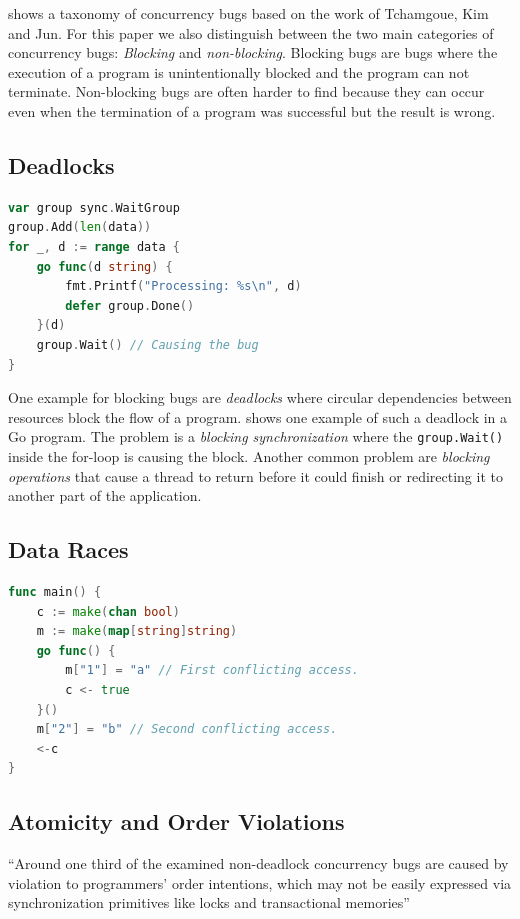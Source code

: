\documentclass[conference]{IEEEtran}
\begin{document}
 shows a taxonomy of concurrency bugs based on the work of Tchamgoue, Kim and Jun. \cite{tchamgoue2012testing}
For this paper we also distinguish between the two main categories of concurrency bugs: \emph{Blocking} and \emph{non-blocking}.
Blocking bugs are bugs where the execution of a program is unintentionally blocked and the program can not terminate.
Non-blocking bugs are often harder to find because they can occur even when the termination of a program was successful but the result is wrong.


\subsection{Deadlocks}
\begin{lstlisting}[language=Go, label=lst:deadlock, caption=Deadlock example -- based on \cite{tu2019go}]
var group sync.WaitGroup
group.Add(len(data))
for _, d := range data {
    go func(d string) {
        fmt.Printf("Processing: %s\n", d)
        defer group.Done()
    }(d)
    group.Wait() // Causing the bug
}
\end{lstlisting}

One example for blocking bugs are \emph{deadlocks} where circular dependencies between resources block the flow of a program.
 shows one example of such a deadlock in a Go program.
The problem is a \emph{blocking synchronization} where the \lstinline{group.Wait()} inside the for-loop is causing the block.
Another common problem are \emph{blocking operations} that cause a thread to return before it could finish or redirecting it to another part of the application.


\subsection{Data Races}
\begin{lstlisting}[language=Go, caption=Data race example -- based on \cite{goRaceDetector}]
func main() {
	c := make(chan bool)
	m := make(map[string]string)
	go func() {
		m["1"] = "a" // First conflicting access.
		c <- true
	}()
	m["2"] = "b" // Second conflicting access.
	<-c
}
\end{lstlisting}



\subsection{Atomicity and Order Violations}
``Around one third of the examined non-deadlock concurrency bugs are caused by violation to programmers' order intentions, which may not be easily expressed via synchronization primitives like locks and transactional memories''\cite{lu2008mistakes}
\end{document}
